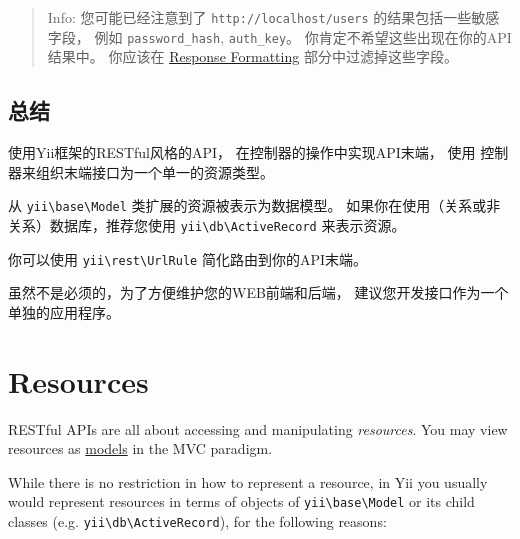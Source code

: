 \begin{quote}Info: 您可能已经注意到了 \lstinline|http://localhost/users| 的结果包括一些敏感字段，
例如 \lstinline|password_hash|, \lstinline|auth_key|。 你肯定不希望这些出现在你的API结果中。
你应该在 \hyperref[rest-response-formatting.md]{Response Formatting} 部分中过滤掉这些字段。

\end{quote}
\subsection{总结 \label{rest-quick-start.md::summary}}
使用Yii框架的RESTful风格的API， 在控制器的操作中实现API末端， 使用
控制器来组织末端接口为一个单一的资源类型。

从 \texttt{yii{\allowbreak{}\textbackslash}base{\allowbreak{}\textbackslash}Model} 类扩展的资源被表示为数据模型。
如果你在使用（关系或非关系）数据库，推荐您使用 \texttt{yii{\allowbreak{}\textbackslash}db{\allowbreak{}\textbackslash}ActiveRecord}
来表示资源。

你可以使用 \texttt{yii{\allowbreak{}\textbackslash}rest{\allowbreak{}\textbackslash}UrlRule} 简化路由到你的API末端。

虽然不是必须的，为了方便维护您的WEB前端和后端，
建议您开发接口作为一个单独的应用程序。



\label{rest-resources.md}\section{Resources}
RESTful APIs are all about accessing and manipulating \textit{resources}. You may view resources as
\hyperref[structure-models.md]{models} in the MVC paradigm.

While there is no restriction in how to represent a resource, in Yii you usually would represent resources
in terms of objects of \texttt{yii{\allowbreak{}\textbackslash}base{\allowbreak{}\textbackslash}Model} or its child classes (e.g. \texttt{yii{\allowbreak{}\textbackslash}db{\allowbreak{}\textbackslash}ActiveRecord}), for the
following reasons:


